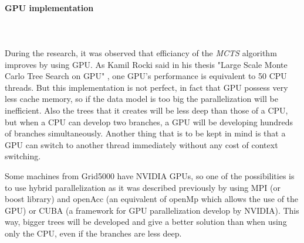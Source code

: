 \paragraph{GPU implementation}\mbox{}\\\mbox{}\\
During the research, it was observed that efficiancy of the \emph{MCTS} algorithm improves by using GPU. As Kamil Rocki said in his thesis "Large Scale Monte Carlo Tree Search on GPU"\cite{GPU} , one GPU's performance is equivalent to 50 CPU threads. But this implementation is not perfect, in fact that GPU possess very less cache memory, so if the data model is too big the parallelization will be inefficient. Also the trees that it creates will be less deep than those of a CPU, but when a CPU can develop two branches, a GPU will be developing hundreds of branches simultaneously. Another thing that is to be kept in mind is that a GPU can switch to another thread immediately without any cost of context switching. 

Some machines from Grid5000 have NVIDIA GPUs, so one of the possibilities is to use hybrid parallelization as it was described previously by using MPI (or boost library) and openAcc (an equivalent of openMp which allows the use of the GPU) or CUBA (a framework for GPU parallelization develop by NVIDIA). This way, bigger trees will be developed and give a better solution than when using only the CPU, even if the branches are less deep.